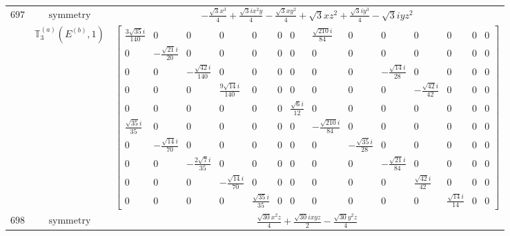 \documentclass[fleqn,8pt,landscape]{jsarticle}
\begin{document}
\begin{longtable}{ccc}
$ 697 $ & $ \text{symmetry} $ & $ - \frac{\sqrt{3} x^{3}}{4} + \frac{\sqrt{3} i x^{2} y}{4} - \frac{\sqrt{3} x y^{2}}{4} + \sqrt{3} x z^{2} + \frac{\sqrt{3} i y^{3}}{4} - \sqrt{3} i y z^{2} $ \\
$  $ & $ \mathbb{T}_{3}^{(a)}(E^{(b)},1) $ & $ \begin{bmatrix} \frac{3 \sqrt{35} i}{140} & 0 & 0 & 0 & 0 & 0 & 0 & \frac{\sqrt{210} i}{84} & 0 & 0 & 0 & 0 & 0 & 0 \\ 0 & - \frac{\sqrt{21} i}{20} & 0 & 0 & 0 & 0 & 0 & 0 & 0 & 0 & 0 & 0 & 0 & 0 \\ 0 & 0 & - \frac{\sqrt{42} i}{140} & 0 & 0 & 0 & 0 & 0 & 0 & - \frac{\sqrt{14} i}{28} & 0 & 0 & 0 & 0 \\ 0 & 0 & 0 & \frac{9 \sqrt{14} i}{140} & 0 & 0 & 0 & 0 & 0 & 0 & - \frac{\sqrt{42} i}{42} & 0 & 0 & 0 \\ 0 & 0 & 0 & 0 & 0 & 0 & \frac{\sqrt{6} i}{12} & 0 & 0 & 0 & 0 & 0 & 0 & 0 \\ \frac{\sqrt{35} i}{35} & 0 & 0 & 0 & 0 & 0 & 0 & - \frac{\sqrt{210} i}{84} & 0 & 0 & 0 & 0 & 0 & 0 \\ 0 & - \frac{\sqrt{14} i}{70} & 0 & 0 & 0 & 0 & 0 & 0 & - \frac{\sqrt{35} i}{28} & 0 & 0 & 0 & 0 & 0 \\ 0 & 0 & - \frac{2 \sqrt{7} i}{35} & 0 & 0 & 0 & 0 & 0 & 0 & - \frac{\sqrt{21} i}{84} & 0 & 0 & 0 & 0 \\ 0 & 0 & 0 & - \frac{\sqrt{14} i}{70} & 0 & 0 & 0 & 0 & 0 & 0 & \frac{\sqrt{42} i}{42} & 0 & 0 & 0 \\ 0 & 0 & 0 & 0 & \frac{\sqrt{35} i}{35} & 0 & 0 & 0 & 0 & 0 & 0 & \frac{\sqrt{14} i}{14} & 0 & 0 \end{bmatrix} $ \\ \hline
$ 698 $ & $ \text{symmetry} $ & $ \frac{\sqrt{30} x^{2} z}{4} + \frac{\sqrt{30} i x y z}{2} - \frac{\sqrt{30} y^{2} z}{4} $ \\

\end{longtable}
\end{document}
